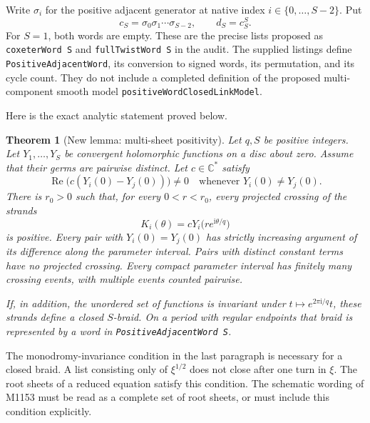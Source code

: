 \documentclass[11pt,oneside]{report}
\newtheorem{theorem}{Theorem}[section]
\theoremstyle{definition}
\numberwithin{equation}{section}
\newcommand{\C}{\mathbb C}
\newcommand{\decl}[1]{\textnormal{\nolinkurl{#1}}}
\newcommand{\ii}{\mathrm i}
\newcommand{\Ree}{\operatorname{Re}}
\begin{document}
Write $\sigma_i$ for the positive adjacent generator at native index
$i\in\{0,\ldots,S-2\}$. Put
\begin{equation}\label{J14:eq:fullword}
 c_S=\sigma_0\sigma_1\cdots\sigma_{S-2},\qquad d_S=c_S^S.
\end{equation}
For $S=1$, both words are empty. These are the precise lists proposed as
\decl{coxeterWord S} and \decl{fullTwistWord S} in the audit. The supplied
listings define \decl{PositiveAdjacentWord}, its conversion to signed words,
its permutation, and its cycle count. They do not include a completed
definition of the proposed multi-component smooth model
\decl{positiveWordClosedLinkModel}.

Here is the exact analytic statement proved below.

\begin{theorem}[New lemma: multi-sheet positivity]\label{J14:thm:multisheet}
Let $q,S$ be positive integers. Let $Y_1,\ldots,Y_S$ be convergent holomorphic
functions on a disc about zero. Assume that their germs are pairwise
distinct. Let $c\in\C^*$ satisfy
\[
 \Ree\bigl(c(Y_i(0)-Y_j(0))\bigr)\ne0
 \quad\text{whenever }Y_i(0)\ne Y_j(0).
\]
There is $r_0>0$ such that, for every $0<r<r_0$, every projected crossing of
the strands
\[
 K_i(\theta)=cY_i\bigl(r e^{\ii\theta/q}\bigr)
\]
is positive. Every pair with $Y_i(0)=Y_j(0)$ has strictly increasing argument
of its difference along the parameter interval. Pairs with distinct constant
terms have no projected crossing. Every compact parameter interval has
finitely many crossing events, with multiple events counted pairwise.

If, in addition, the unordered set of functions is invariant under
$t\mapsto e^{2\pi\ii/q}t$, these strands define a closed $S$-braid. On a
period with regular endpoints that braid is represented by a word in
\decl{PositiveAdjacentWord S}.
\end{theorem}

The monodromy-invariance condition in the last paragraph is necessary for a
closed braid. A list consisting only of $\xi^{1/2}$ does not close after one
turn in $\xi$. The root sheets of a reduced equation satisfy this condition.
The schematic wording of M1153 must be read as a complete set of root sheets,
or must include this condition explicitly.
\end{document}
